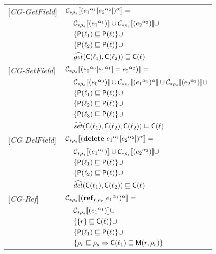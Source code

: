 \newpage
\begin{tabular} {l l l l}
{[\textit{CG-GetField}]}&\multicolumn{3}{l}{$\mathcal{C}_{*\rho_s}\llbracket ({e_1}^{\alpha_1}[{e_2}^{\alpha_2}])^\alpha \rrbracket = $}\\
&&\multicolumn{2}{l}{$ \mathcal{C}_{*\rho_s}\llbracket ({e_1}^{\alpha_1}) \rrbracket \cup \mathcal{C}_{*\rho_s}\llbracket ({e_2}^{\alpha_2}) \rrbracket \cup$}\\
&&\multicolumn{2}{l}{$\{ \mathsf{P}(\ell_1) \sqsubseteq \mathsf{P}(\ell) \} \cup$} \\
&&\multicolumn{2}{l}{$\{ \mathsf{P}(\ell_2) \sqsubseteq \mathsf{P}(\ell) \} \cup$} \\
&&\multicolumn{2}{l}{$\widehat{get} (\mathsf{C}(\ell_1), \mathsf{C}(\ell_2)) \sqsubseteq \mathsf{C}(\ell)$} \\
{[\textit{CG-SetField}]}&\multicolumn{3}{l}{$\mathcal{C}_{*\rho_s}\llbracket ({e_0}^{\alpha_0}[{e_1}^{\alpha_1}] = {e_2}^{\alpha_2}) \rrbracket = $}\\
&&\multicolumn{2}{l}{$ \mathcal{C}_{*\rho_s}\llbracket ({e_0}^{\alpha_0}) \rrbracket \cup \mathcal{C}_{*\rho_s}\llbracket ({e_1}^{\alpha_1})^\alpha \rrbracket \cup \mathcal{C}_{*\rho_s}\llbracket ({e_2}^{\alpha_2}) \rrbracket \cup $}\\
&&\multicolumn{2}{l}{$\{ \mathsf{P}(\ell_1) \sqsubseteq \mathsf{P}(\ell) \} \cup$} \\
&&\multicolumn{2}{l}{$\{ \mathsf{P}(\ell_2) \sqsubseteq \mathsf{P}(\ell) \} \cup$} \\
&&\multicolumn{2}{l}{$\{ \mathsf{P}(\ell_3) \sqsubseteq \mathsf{P}(\ell) \} \cup$} \\
&&\multicolumn{2}{l}{$\widehat{set} (\mathsf{C}(\ell_1), \mathsf{C}(\ell_2), \mathsf{C}(\ell_2)) \sqsubseteq \mathsf{C}(\ell)$} \\
{[\textit{CG-DelField}]}&\multicolumn{3}{l}{$\mathcal{C}_{*\rho_s}\llbracket (\mathbf{delete}\ {e_1}^{\alpha_1}[{e_2}^{\alpha_2}])^\alpha \rrbracket = $}\\ 
&&\multicolumn{2}{l}{$ \mathcal{C}_{*\rho_s}\llbracket ({e_1}^{\alpha_1}) \rrbracket \cup \mathcal{C}_{*\rho_s}\llbracket ({e_2}^{\alpha_2}) \rrbracket \cup$}\\
&&\multicolumn{2}{l}{$\{ \mathsf{P}(\ell_1) \sqsubseteq \mathsf{P}(\ell) \} \cup$} \\
&&\multicolumn{2}{l}{$\{ \mathsf{P}(\ell_2) \sqsubseteq \mathsf{P}(\ell) \} \cup$} \\
&&\multicolumn{2}{l}{$\widehat{del} (\mathsf{C}(\ell_1), \mathsf{C}(\ell_2)) \sqsubseteq \mathsf{C}(\ell)$}\\
{[\textit{CG-Ref}]}&\multicolumn{3}{l}{$ \mathcal{C}_{*\rho_s}\llbracket (\mathbf{ref}_{r,\rho_r}\ {e_1}^{\alpha_1})^\alpha \rrbracket = $}\\
&&\multicolumn{2}{l}{$\mathcal{C}_{*\rho_s}\llbracket ({e_1}^{\alpha_1}) \rrbracket \cup $}\\
&&\multicolumn{2}{l}{$\{ \{r\} \sqsubseteq \mathsf{C}(\ell) \} \cup$}\\
&&\multicolumn{2}{l}{$\{ \mathsf{P}(\ell_1) \sqsubseteq \mathsf{P}(\ell) \} \cup$}\\
&&\multicolumn{2}{l}{$\{ \rho_r \sqsubseteq \rho_s \Rightarrow \mathsf{C}(\ell_1) \sqsubseteq \mathsf{M}(r, \rho_r) \} $}\\

\end{tabular}
